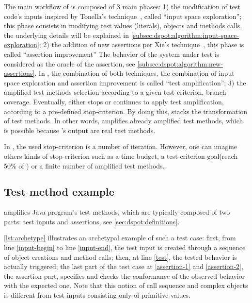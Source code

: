 The main workflow of \dspot is composed of 3 main phases:
1) the modification of test code's inputs inspired by Tonella's technique~\cite{tonella}, called ``input space exploration''; 
this phase consists in modifying test values (\eg literals), objects and methods calls, the underlying details will be explained in \autoref{subsec:dspot:algorithm:input-space-exploration};
2) the addition of new assertions per Xie's technique~\cite{Xie2006}, this phase is called ``assertion improvement''
The behavior of the system under test is considered as the oracle of the assertion, see \autoref{subsec:dspot:algorithm:new-assertions}.
In \dspot, the combination of both techniques, \ie the combination of input space exploration and assertion improvement is called ``test amplification'';
3) the amplified test methods selection according to a given test-criterion, \eg branch coverage.
Eventually, \dspot either stops or continues to apply test amplification, according to a pre-defined stop-criterion.
By doing this, \dspot stacks the transformation of test methods.
In other words, \dspot amplifies already amplified test methods, which is possible because \dspot's output are real test methods.

In \dspot, the used stop-criterion is a number of iteration.
However, one can imagine others kinds of stop-criterion such as a time budget, a test-criterion goal(\eg reach 50\% of \ms) or a finite number of amplified test methods.

\subsection{Test method example}
\label{subsec:dspot:overview:appliance-to-unit-test}

\dspot amplifies Java program's test methods, which are typically composed of two parts: test inputs and assertions, see \autoref{sec:dspot:definitions}.

\autoref{lst:archetype} illustrates an archetypal example of such a test case: 
first, from line \autoref{input-begin} to line \autoref{input-end}, the test input is created through a sequence of object creations and method calls; 
then, at line \autoref{test}, the tested behavior is actually triggered; 
the last part of the test case at \autoref{assertion-1} and \autoref{assertion-2}, the assertion part, specifies and checks the conformance of the observed behavior with the expected one.
Note that this notion of call sequence and complex objects is different from test inputs consisting only of primitive values.

